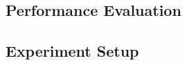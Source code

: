 \documentclass{beamer}
\begin{document}
\begin{CJK}{UTF8}{bkai}



            \section{Performance Evaluation}
            \subsection{Experiment Setup}


\end{CJK}
\end{document}
